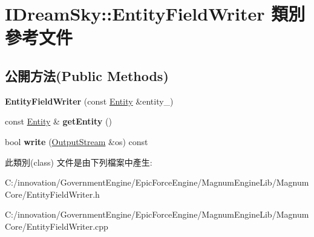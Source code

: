 \hypertarget{class_i_dream_sky_1_1_entity_field_writer}{}\section{I\+Dream\+Sky\+:\+:Entity\+Field\+Writer 類別 參考文件}
\label{class_i_dream_sky_1_1_entity_field_writer}
\subsection*{公開方法(Public Methods)}
\begin{DoxyCompactItemize}
\item 
{\bfseries Entity\+Field\+Writer} (const \hyperlink{class_i_dream_sky_1_1_entity}{Entity} \&entity\+\_\+)\hypertarget{class_i_dream_sky_1_1_entity_field_writer_aba705d51a901a6424d40d4c49b7961a5}{}\label{class_i_dream_sky_1_1_entity_field_writer_aba705d51a901a6424d40d4c49b7961a5}

\item 
const \hyperlink{class_i_dream_sky_1_1_entity}{Entity} \& {\bfseries get\+Entity} ()\hypertarget{class_i_dream_sky_1_1_entity_field_writer_a6281389d8f6bc685e7f023eed8b06c98}{}\label{class_i_dream_sky_1_1_entity_field_writer_a6281389d8f6bc685e7f023eed8b06c98}

\item 
bool {\bfseries write} (\hyperlink{class_i_dream_sky_1_1_output_stream}{Output\+Stream} \&os) const \hypertarget{class_i_dream_sky_1_1_entity_field_writer_a3b9e3d3cea06ac696c330462f80610f5}{}\label{class_i_dream_sky_1_1_entity_field_writer_a3b9e3d3cea06ac696c330462f80610f5}

\end{DoxyCompactItemize}


此類別(class) 文件是由下列檔案中產生\+:\begin{DoxyCompactItemize}
\item 
C\+:/innovation/\+Government\+Engine/\+Epic\+Force\+Engine/\+Magnum\+Engine\+Lib/\+Magnum\+Core/Entity\+Field\+Writer.\+h\item 
C\+:/innovation/\+Government\+Engine/\+Epic\+Force\+Engine/\+Magnum\+Engine\+Lib/\+Magnum\+Core/Entity\+Field\+Writer.\+cpp\end{DoxyCompactItemize}
